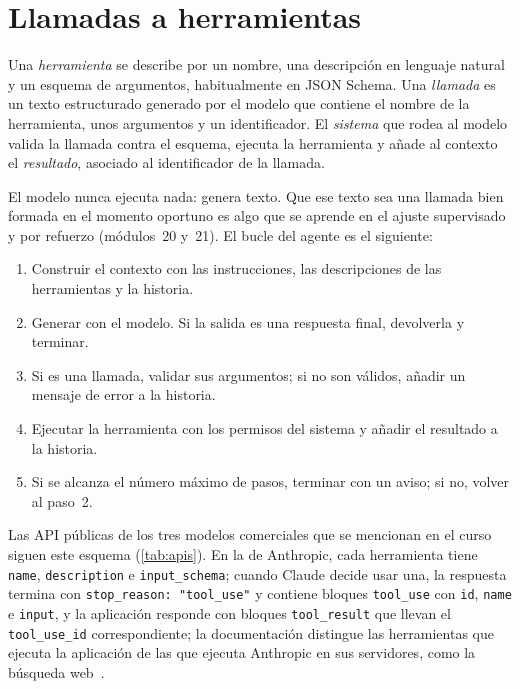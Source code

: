 \addtocounter{definicion}{1}%

\section{Llamadas a herramientas}

\begin{definicion}\label{def:herramienta}
Una \emph{herramienta} se describe por un nombre, una descripción en lenguaje natural y un esquema de argumentos, habitualmente en JSON Schema. Una \emph{llamada} es un texto estructurado generado por el modelo que contiene el nombre de la herramienta, unos argumentos y un identificador. El \emph{sistema} que rodea al modelo valida la llamada contra el esquema, ejecuta la herramienta y añade al contexto el \emph{resultado}, asociado al identificador de la llamada.
\end{definicion}

El modelo nunca ejecuta nada: genera texto. Que ese texto sea una llamada bien formada en el momento oportuno es algo que se aprende en el ajuste supervisado y por refuerzo (módulos~20 y~21). El bucle del agente es el siguiente:
\begin{enumerate}[label=\arabic*.]
  \item Construir el contexto con las instrucciones, las descripciones de las herramientas y la historia.
  \item Generar con el modelo. Si la salida es una respuesta final, devolverla y terminar.
  \item Si es una llamada, validar sus argumentos; si no son válidos, añadir un mensaje de error a la historia.
  \item Ejecutar la herramienta con los permisos del sistema y añadir el resultado a la historia.
  \item Si se alcanza el número máximo de pasos, terminar con un aviso; si no, volver al paso~2.
\end{enumerate}

\addtocounter{definicion}{1}%

Las API públicas de los tres modelos comerciales que se mencionan en el curso siguen este esquema (\cref{tab:apis}). En la de Anthropic, cada herramienta tiene \texttt{name}, \texttt{description} e \texttt{input\_schema}; cuando Claude decide usar una, la respuesta termina con \texttt{stop\_reason: "tool\_use"} y contiene bloques \texttt{tool\_use} con \texttt{id}, \texttt{name} e \texttt{input}, y la aplicación responde con bloques \texttt{tool\_result} que llevan el \texttt{tool\_use\_id} correspondiente; la documentación distingue las herramientas que ejecuta la aplicación de las que ejecuta Anthropic en sus servidores, como la búsqueda web~\cite{claude-tools}.


